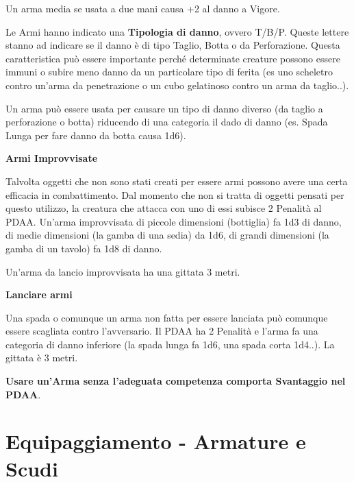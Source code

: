 \documentclass[12pt,a4paper,twoside,openany]{book}
\begin{document}
\begin{multicols}{2}
\medskip

Un arma media se usata a due mani causa +2 al danno a Vigore.


Le Armi hanno indicato una \textbf{Tipologia di danno}, ovvero T/B/P.
Queste lettere stanno ad indicare se il danno è di tipo Taglio, Botta o da Perforazione. Questa caratteristica può essere importante perché determinate creature possono essere immuni o subire meno danno da un particolare tipo di ferita (es uno scheletro contro un'arma da penetrazione o un cubo gelatinoso contro un arma da taglio..).

Un arma può essere usata per causare un tipo di danno diverso (da taglio a perforazione o botta) riducendo di una categoria il dado di danno (es. Spada Lunga per fare danno da botta causa 1d6).

\medskip

\textbf{Armi Improvvisate}

Talvolta oggetti che non sono stati creati per essere armi possono avere una certa efficacia in combattimento. Dal momento che non si tratta di oggetti pensati per questo utilizzo, la creatura che attacca con uno di essi subisce 2 Penalità al PDAA. Un'arma improvvisata di piccole dimensioni (bottiglia) fa 1d3 di danno, di medie dimensioni (la gamba di una sedia) da 1d6, di grandi dimensioni (la gamba di un tavolo) fa 1d8 di danno.

Un'arma da lancio improvvisata ha una gittata 3 metri.

\medskip

\textbf{Lanciare armi}

Una spada o comunque un arma non fatta per essere lanciata può comunque essere scagliata contro l'avversario. Il PDAA ha 2 Penalità e l'arma fa una categoria di danno inferiore (la spada lunga fa 1d6, una spada corta 1d4..). La gittata è 3 metri.

\medskip

\textbf{Usare un'Arma senza l'adeguata competenza comporta Svantaggio nel PDAA}.

\end{multicols}

\pagebreak

\section{Equipaggiamento - Armature e Scudi} \hypertarget{equipaggiamento.armature.scudi}{}\label{equipaggiamentoarmature}
\end{document}
